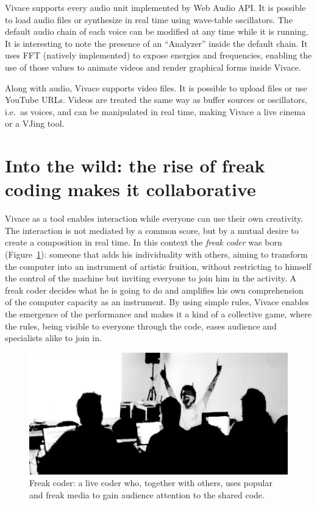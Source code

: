\documentclass[12pt,times,twocolumn]{article}
\begin{document}
Vivace supports every audio unit implemented by Web Audio API. It is
possible to load audio files or synthesize in real time using
wave-table oscillators. The default audio chain of each voice can be
modified at any time while it is running. It is interesting to note
the presence of an ``Analyzer'' inside the default chain. It uses FFT
(natively implemented) to expose energies and frequencies, enabling
the use of those values to animate videos and render graphical forms
inside Vivace.

Along with audio, Vivace supports video files. It is possible to
upload files or use YouTube URLs. Videos are treated the same way as
buffer sources or oscillators, i.e.\ as voices, and can be manipulated
in real time, making Vivace a live cinema or a VJing tool.

\section{Into the wild: the rise of freak coding makes it collaborative}
Vivace as a tool enables interaction while everyone can use their
own creativity. The interaction is not mediated by a common score, but
by a mutual desire to create a composition in real time. In this
context the \emph{freak coder} was born (Figure~\ref{fig:freakcoder}):
someone that adds his individuality with others, aiming to transform
the computer into an instrument of artistic fruition, without
restricting to himself the control of the machine but inviting
everyone to join him in the activity. A freak coder decides what
he is going to do and amplifies his own comprehension of the computer
capacity as an instrument. By using simple rules, Vivace enables the
emergence of the performance and makes it a kind of a collective game,
where the rules, being visible to everyone through the code, eases audience and
specialists alike to join in.

\begin{figure}[htpb]
  \begin{center}
    \includegraphics[scale=.2]{img/fig_freakcoder_.png}
    \caption{Freak coder: a live coder who, together with others, uses
      popular and freak media to gain audience attention to the shared
      code.}
    \label{fig:freakcoder}
  \end{center}
\end{figure}
\end{document}
